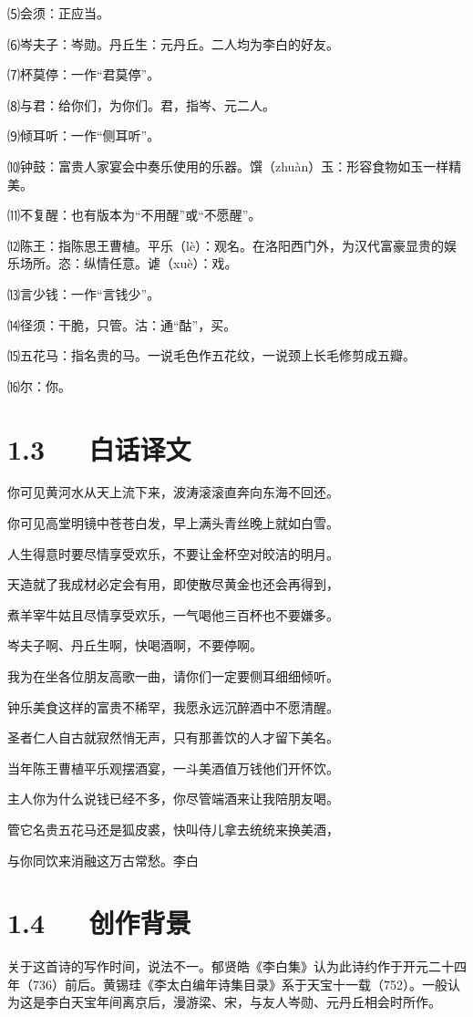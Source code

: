 \documentclass[letterpaper,12pt,english]{sphinxmanual}
\begin{document}
⑸会须：正应当。

⑹岑夫子：岑勋。丹丘生：元丹丘。二人均为李白的好友。

⑺杯莫停：一作“君莫停”。

⑻与君：给你们，为你们。君，指岑、元二人。

⑼倾耳听：一作“侧耳听”。

⑽钟鼓：富贵人家宴会中奏乐使用的乐器。馔（zhuàn）玉：形容食物如玉一样精美。

⑾不复醒：也有版本为“不用醒”或“不愿醒”。

⑿陈王：指陈思王曹植。平乐（lè）：观名。在洛阳西门外，为汉代富豪显贵的娱乐场所。恣：纵情任意。谑（xuè）：戏。

⒀言少钱：一作“言钱少”。

⒁径须：干脆，只管。沽：通“酤”，买。

⒂五花马：指名贵的马。一说毛色作五花纹，一说颈上长毛修剪成五瓣。

⒃尔：你。


\section{1.3   白话译文}
\label{\detokenize{p01_u6563_u6587/_u674e_u767d-_u5c06_u8fdb_u9152:id5}}
你可见黄河水从天上流下来，波涛滚滚直奔向东海不回还。

你可见高堂明镜中苍苍白发，早上满头青丝晚上就如白雪。

人生得意时要尽情享受欢乐，不要让金杯空对皎洁的明月。

天造就了我成材必定会有用，即使散尽黄金也还会再得到，

煮羊宰牛姑且尽情享受欢乐，一气喝他三百杯也不要嫌多。

岑夫子啊、丹丘生啊，快喝酒啊，不要停啊。

我为在坐各位朋友高歌一曲，请你们一定要侧耳细细倾听。

钟乐美食这样的富贵不稀罕，我愿永远沉醉酒中不愿清醒。

圣者仁人自古就寂然悄无声，只有那善饮的人才留下美名。

当年陈王曹植平乐观摆酒宴，一斗美酒值万钱他们开怀饮。

主人你为什么说钱已经不多，你尽管端酒来让我陪朋友喝。

管它名贵五花马还是狐皮裘，快叫侍儿拿去统统来换美酒，

与你同饮来消融这万古常愁。李白


\section{1.4   创作背景}
\label{\detokenize{p01_u6563_u6587/_u674e_u767d-_u5c06_u8fdb_u9152:id6}}
关于这首诗的写作时间，说法不一。郁贤皓《李白集》认为此诗约作于开元二十四年（736）前后。黄锡珪《李太白编年诗集目录》系于天宝十一载（752）。一般认为这是李白天宝年间离京后，漫游梁、宋，与友人岑勋、元丹丘相会时所作。
\end{document}
